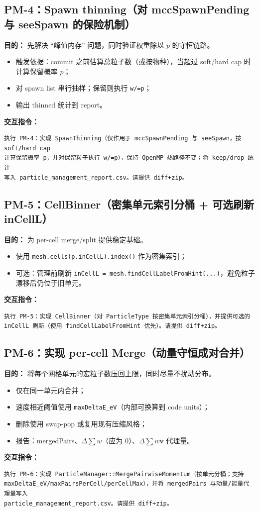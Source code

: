 \documentclass[UTF8,11pt,a4paper]{ctexart}
\begin{document}
\subsection{PM-4：Spawn thinning（对 mccSpawnPending 与 seeSpawn 的保险机制）}
\textbf{目的：} 先解决 ``峰值内存'' 问题，同时验证权重除以 $p$ 的守恒链路。
\begin{itemize}[itemsep=2pt]
  \item 触发依据：commit 之前估算总粒子数（或按物种），当超过 soft/hard cap 时计算保留概率 $p$；
  \item 对 spawn list 串行抽样；保留则执行 \texttt{w/=p}；
  \item 输出 thinned 统计到 report。
\end{itemize}
\textbf{交互指令：}
\begin{verbatim}
执行 PM-4：实现 SpawnThinning（仅作用于 mccSpawnPending 与 seeSpawn，按 soft/hard cap
计算保留概率 p，并对保留粒子执行 w/=p），保持 OpenMP 热路径不变；将 keep/drop 统计
写入 particle_management_report.csv。请提供 diff+zip。
\end{verbatim}

\subsection{PM-5：CellBinner（密集单元索引分桶 + 可选刷新 inCellL）}
\textbf{目的：} 为 per-cell merge/split 提供稳定基础。
\begin{itemize}[itemsep=2pt]
  \item 使用 \texttt{mesh.cells(p.inCellL).index()} 作为密集索引；
  \item 可选：管理前刷新 \texttt{inCellL = mesh.findCellLabelFromHint(...)}，避免粒子漂移后仍位于旧单元。
\end{itemize}
\textbf{交互指令：}
\begin{verbatim}
执行 PM-5：实现 CellBinner（对 ParticleType 按密集单元索引分桶），并提供可选的
inCellL 刷新（使用 findCellLabelFromHint 优先）。请提供 diff+zip。
\end{verbatim}

\subsection{PM-6：实现 per-cell Merge（动量守恒成对合并）}
\textbf{目的：} 将每个网格单元的宏粒子数压回上限，同时尽量不扰动分布。
\begin{itemize}[itemsep=2pt]
  \item 仅在同一单元内合并；
  \item 速度相近阈值使用 \texttt{maxDeltaE\_eV}（内部可换算到 code units）；
  \item 删除使用 swap-pop 或复用现有压缩风格；
  \item 报告：mergedPairs、$\Delta\sum w$（应为 0）、$\Delta\sum w\mathbf{v}$ 代理量。
\end{itemize}
\textbf{交互指令：}
\begin{verbatim}
执行 PM-6：实现 ParticleManager::MergePairwiseMomentum（按单元分桶；支持
maxDeltaE_eV/maxPairsPerCell/perCellMax），并将 mergedPairs 与动量/能量代理量写入
particle_management_report.csv。请提供 diff+zip。
\end{verbatim}
\end{document}
